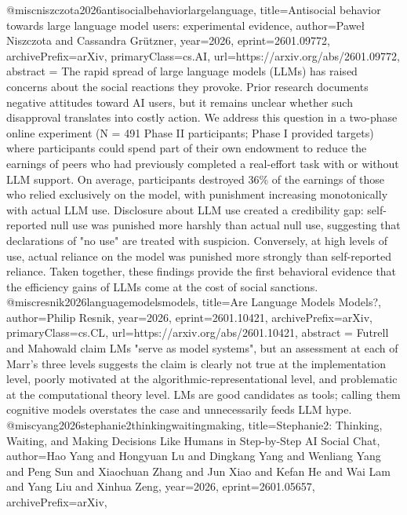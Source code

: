 {}@misc{niszczota2026antisocialbehaviorlargelanguage,
      title={Antisocial behavior towards large language model users: experimental evidence}, 
      author={Paweł Niszczota and Cassandra Grützner},
      year={2026},
      eprint={2601.09772},
      archivePrefix={arXiv},
      primaryClass={cs.AI},
      url={https://arxiv.org/abs/2601.09772},
      abstract = {The rapid spread of large language models (LLMs) has raised concerns about the social reactions they provoke. Prior research documents negative attitudes toward AI users, but it remains unclear whether such disapproval translates into costly action. We address this question in a two-phase online experiment (N = 491 Phase II participants; Phase I provided targets) where participants could spend part of their own endowment to reduce the earnings of peers who had previously completed a real-effort task with or without LLM support. On average, participants destroyed 36\% of the earnings of those who relied exclusively on the model, with punishment increasing monotonically with actual LLM use. Disclosure about LLM use created a credibility gap: self-reported null use was punished more harshly than actual null use, suggesting that declarations of "no use" are treated with suspicion. Conversely, at high levels of use, actual reliance on the model was punished more strongly than self-reported reliance. Taken together, these findings provide the first behavioral evidence that the efficiency gains of LLMs come at the cost of social sanctions.}
}@misc{resnik2026languagemodelsmodels,
      title={Are Language Models Models?}, 
      author={Philip Resnik},
      year={2026},
      eprint={2601.10421},
      archivePrefix={arXiv},
      primaryClass={cs.CL},
      url={https://arxiv.org/abs/2601.10421},
      abstract = {Futrell and Mahowald claim LMs "serve as model systems", but an assessment at each of Marr's three levels suggests the claim is clearly not true at the implementation level, poorly motivated at the algorithmic-representational level, and problematic at the computational theory level. LMs are good candidates as tools; calling them cognitive models overstates the case and unnecessarily feeds LLM hype.}
}@misc{yang2026stephanie2thinkingwaitingmaking,
      title={Stephanie2: Thinking, Waiting, and Making Decisions Like Humans in Step-by-Step AI Social Chat}, 
      author={Hao Yang and Hongyuan Lu and Dingkang Yang and Wenliang Yang and Peng Sun and Xiaochuan Zhang and Jun Xiao and Kefan He and Wai Lam and Yang Liu and Xinhua Zeng},
      year={2026},
      eprint={2601.05657},
      archivePrefix={arXiv},
}
